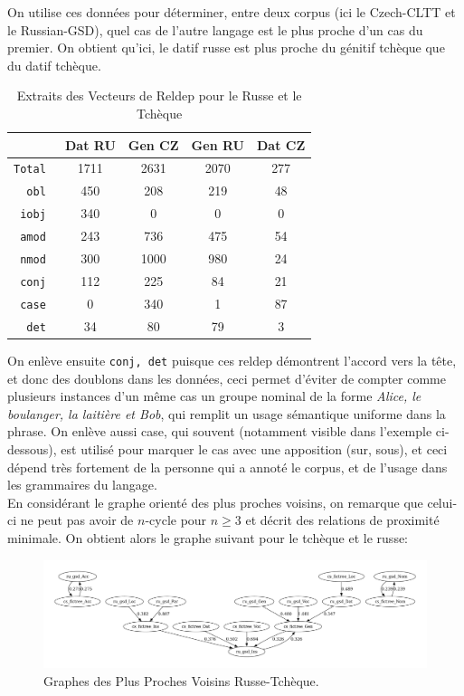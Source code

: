 \documentclass{cours}
\begin{document}
    On utilise ces données pour déterminer, entre deux corpus (ici le Czech-CLTT et le Russian-GSD), quel cas de l'autre langage est le plus proche d'un cas du premier.
    On obtient qu'ici, le datif russe est plus proche du génitif tchèque que du datif tchèque.
    \begin{table}[H]
	    \centering
    \begin{tabular}{>{\tt}r|cccc}
        \toprule
        &Dat RU & Gen CZ & Gen RU & Dat CZ\\
        \midrule
        Total & 1711 & 2631 & 2070 & 277\\
        obl & 450 & 208 & 219 & 48\\
        iobj & 340 & 0 & 0 & 0\\
        amod & 243 & 736 & 475 & 54\\
        nmod & 300 & 1000 & 980 & 24\\
        conj & 112 & 225 & 84 & 21\\
        case & 0 & 340 & 1 & 87\\
        det & 34 & 80 & 79 & 3\\
        \bottomrule
    \end{tabular}
	\caption{Extraits des Vecteurs de Reldep pour le Russe et le Tchèque}
    \end{table}
    On enlève ensuite \texttt{conj, det} puisque ces reldep démontrent l'accord vers la tête, et donc des doublons dans les données, ceci permet d'éviter de compter comme plusieurs instances d'un même cas un groupe nominal de la forme \emph{Alice, le boulanger, la laitière et Bob}, qui remplit un usage sémantique uniforme dans la phrase.
    On enlève aussi case, qui souvent (notamment visible dans l'exemple ci-dessous), est utilisé pour marquer le cas avec une apposition (sur, sous), et ceci dépend très fortement de la personne qui a annoté le corpus, et de l'usage dans les grammaires du langage.\\
    En considérant le graphe orienté des plus proches voisins, on remarque que celui-ci ne peut pas avoir de $n$-cycle pour $n \geq 3$ et décrit des relations de proximité minimale.
    On obtient alors le graphe suivant pour le tchèque et le russe:
    \begin{figure}[H]
	    \centering
	    \includegraphics[width=\textwidth]{Figures/GNN/gnn_ru_gsd_cs_fictree}
	    \caption{Graphes des Plus Proches Voisins Russe-Tchèque.}
    \end{figure}
\end{document}
